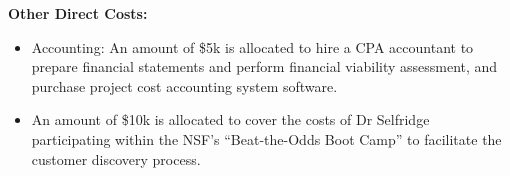 \documentclass[11pt]{article}
\begin{document}
{\bf Other Direct Costs:}
\begin{itemize}
\item Accounting: An amount of \$5k is allocated to hire a CPA accountant to prepare financial statements and perform financial viability assessment, and purchase project cost accounting system software.
\item An amount of \$10k is allocated to cover the costs of Dr Selfridge participating within the NSF's ``Beat-the-Odds Boot Camp'' to facilitate the customer discovery process.
\end{itemize}
\end{document}
